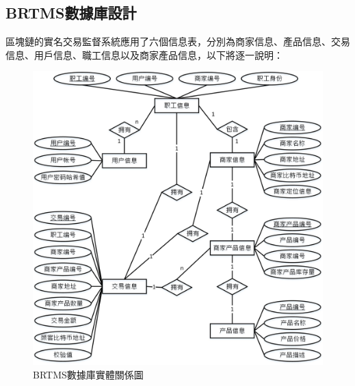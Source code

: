 	\subsection{BRTMS數據庫設計}

	區塊鏈的實名交易監督系統應用了六個信息表，分別為商家信息、產品信息、交易信息、用戶信息、職工信息以及商家產品信息，以下將逐一說明：

		\begin{figure}[htbp]
			\centering
			\includegraphics[width = 1\textwidth]{er.jpg}
			\caption{BRTMS數據庫實體關係圖}\label{db}
		\end{figure}

